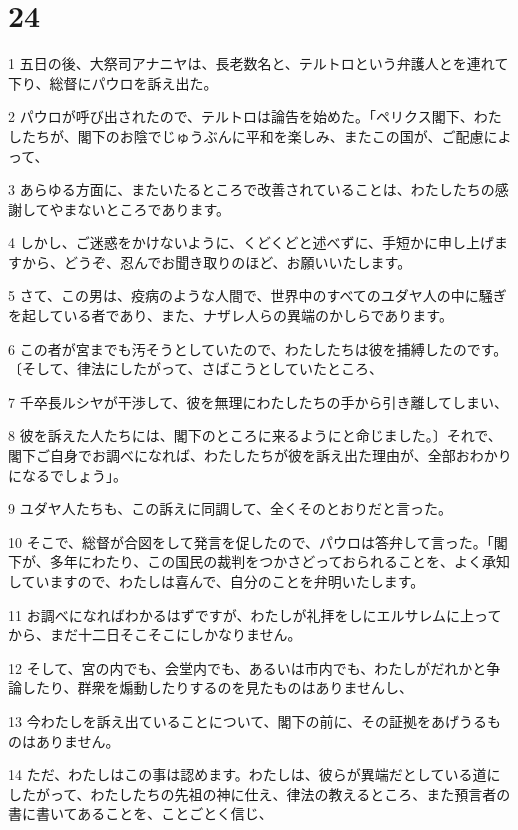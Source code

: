 \chapter{24}

\par 1 五日の後、大祭司アナニヤは、長老数名と、テルトロという弁護人とを連れて下り、総督にパウロを訴え出た。
\par 2 パウロが呼び出されたので、テルトロは論告を始めた。「ペリクス閣下、わたしたちが、閣下のお陰でじゅうぶんに平和を楽しみ、またこの国が、ご配慮によって、
\par 3 あらゆる方面に、またいたるところで改善されていることは、わたしたちの感謝してやまないところであります。
\par 4 しかし、ご迷惑をかけないように、くどくどと述べずに、手短かに申し上げますから、どうぞ、忍んでお聞き取りのほど、お願いいたします。
\par 5 さて、この男は、疫病のような人間で、世界中のすべてのユダヤ人の中に騒ぎを起している者であり、また、ナザレ人らの異端のかしらであります。
\par 6 この者が宮までも汚そうとしていたので、わたしたちは彼を捕縛したのです。〔そして、律法にしたがって、さばこうとしていたところ、
\par 7 千卒長ルシヤが干渉して、彼を無理にわたしたちの手から引き離してしまい、
\par 8 彼を訴えた人たちには、閣下のところに来るようにと命じました。〕それで、閣下ご自身でお調べになれば、わたしたちが彼を訴え出た理由が、全部おわかりになるでしょう」。
\par 9 ユダヤ人たちも、この訴えに同調して、全くそのとおりだと言った。
\par 10 そこで、総督が合図をして発言を促したので、パウロは答弁して言った。「閣下が、多年にわたり、この国民の裁判をつかさどっておられることを、よく承知していますので、わたしは喜んで、自分のことを弁明いたします。
\par 11 お調べになればわかるはずですが、わたしが礼拝をしにエルサレムに上ってから、まだ十二日そこそこにしかなりません。
\par 12 そして、宮の内でも、会堂内でも、あるいは市内でも、わたしがだれかと争論したり、群衆を煽動したりするのを見たものはありませんし、
\par 13 今わたしを訴え出ていることについて、閣下の前に、その証拠をあげうるものはありません。
\par 14 ただ、わたしはこの事は認めます。わたしは、彼らが異端だとしている道にしたがって、わたしたちの先祖の神に仕え、律法の教えるところ、また預言者の書に書いてあることを、ことごとく信じ、
